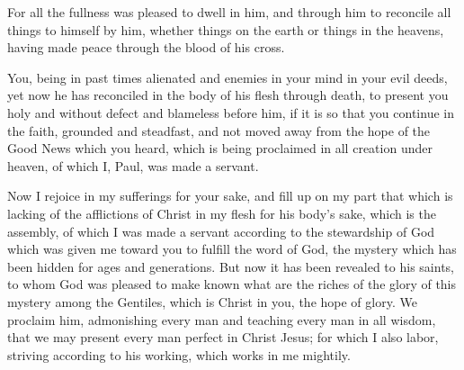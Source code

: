 {For all the fullness was pleased to dwell in him,
and through him to reconcile all things to himself by him, whether things on the earth or things in the heavens, having made peace through the blood of his cross.
\par }{\PP {}You, being in past times alienated and enemies in your mind in your evil deeds,
yet now he has reconciled in the body of his flesh through death, to present you holy and without defect and blameless before him,
if it is so that you continue in the faith, grounded and steadfast, and not moved away from the hope of the Good News which you heard, which is being proclaimed in all creation under heaven, of which I, Paul, was made a servant.
\par }{\PP {}Now I rejoice in my sufferings for your sake, and fill up on my part that which is lacking of the afflictions of Christ in my flesh for his body’s sake, which is the assembly,
of which I was made a servant according to the stewardship of God which was given me toward you to fulfill the word of God,
the mystery which has been hidden for ages and generations. But now it has been revealed to his saints,
to whom God was pleased to make known what are the riches of the glory of this mystery among the Gentiles, which is Christ in you, the hope of glory.
We proclaim him, admonishing every man and teaching every man in all wisdom, that we may present every man perfect in Christ Jesus;
for which I also labor, striving according to his working, which works in me mightily.

}
